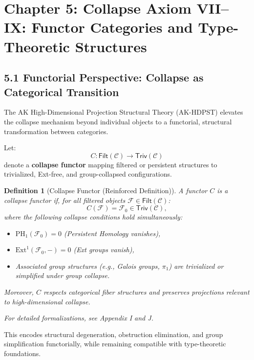 \documentclass[11pt]{article}
\newtheorem{definition}[theorem]{Definition}
\begin{document}
\section{Chapter 5: Collapse Axiom VII--IX: Functor Categories and Type-Theoretic Structures }

\subsection*{5.1 Functorial Perspective: Collapse as Categorical Transition}

The AK High-Dimensional Projection Structural Theory (AK-HDPST) elevates the collapse mechanism beyond individual objects to a functorial, structural transformation between categories.

Let:
\[
C: \mathsf{Filt}(\mathcal{C}) \longrightarrow \mathsf{Triv}(\mathcal{C})
\]
denote a \textbf{collapse functor} mapping filtered or persistent structures to trivialized, Ext-free, and group-collapsed configurations.

\begin{definition}[Collapse Functor (Reinforced Definition)]
A functor \( C \) is a collapse functor if, for all filtered objects \( \mathcal{F} \in \mathsf{Filt}(\mathcal{C}) \):
\[
C(\mathcal{F}) = \mathcal{F}_0 \in \mathsf{Triv}(\mathcal{C}),
\]
where the following collapse conditions hold simultaneously:
\begin{itemize}
    \item \(\mathrm{PH}_1(\mathcal{F}_0) = 0\) \quad (Persistent Homology vanishes),
    \item \(\mathrm{Ext}^1(\mathcal{F}_0, -) = 0\) \quad (Ext groups vanish),
    \item Associated group structures (e.g., Galois groups, \(\pi_1\)) are trivialized or simplified under group collapse.
\end{itemize}
Moreover, \( C \) respects categorical fiber structures and preserves projections relevant to high-dimensional collapse.

For detailed formalizations, see Appendix I and J.
\end{definition}

This encodes structural degeneration, obstruction elimination, and group simplification functorially, while remaining compatible with type-theoretic foundations.
\end{document}

